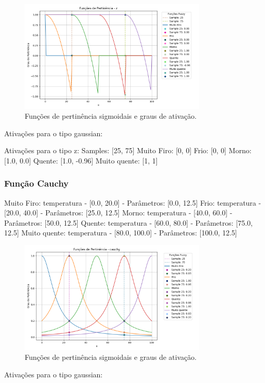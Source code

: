 \documentclass[a4paper,12pt]{article}
\begin{document}
\begin{figure}[H]
    \centering
    \includegraphics[width=0.8\textwidth]{img/funções_de_pertinência_z_fuzzificado.png}
    \caption{Funções de pertinência sigmoidais e graus de ativação.}
\end{figure}
Ativações para o tipo gaussian:

Ativações para o tipo z:
Samples: [25, 75]
Muito Firo: [0, 0]
Frio: [0, 0]
Morno: [1.0, 0.0]
Quente: [1.0, -0.96]
Muito quente: [1, 1]

\subsubsection{Função Cauchy}

Muito Firo: temperatura - [0.0, 20.0] - Parâmetros: [0.0, 12.5]
Frio: temperatura - [20.0, 40.0] - Parâmetros: [25.0, 12.5]
Morno: temperatura - [40.0, 60.0] - Parâmetros: [50.0, 12.5]
Quente: temperatura - [60.0, 80.0] - Parâmetros: [75.0, 12.5]
Muito quente: temperatura - [80.0, 100.0] - Parâmetros: [100.0, 12.5]

\begin{figure}[H]
    \centering
    \includegraphics[width=0.8\textwidth]{img/funções_de_pertinência_cauchy_fuzzificado.png}
    \caption{Funções de pertinência sigmoidais e graus de ativação.}
\end{figure}
Ativações para o tipo gaussian:
\end{document}
